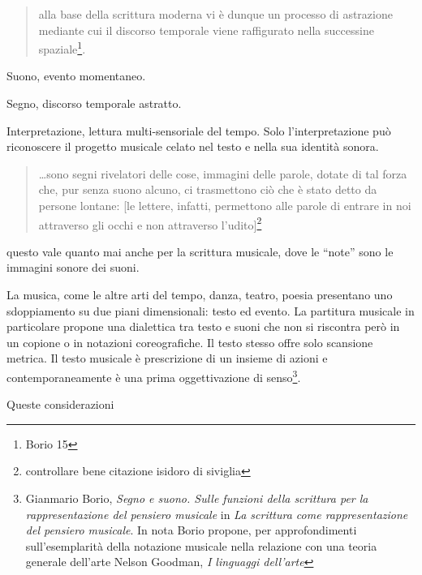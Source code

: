 \begin{multicols}{2}
\begin{quote}
	alla base della scrittura moderna vi è dunque un processo di astrazione mediante cui il discorso temporale viene raffigurato nella successine spaziale\footnote{Borio 15}.
\end{quote}

Suono, evento momentaneo.

Segno, discorso temporale astratto.

Interpretazione, lettura multi-sensoriale del tempo. Solo l'interpretazione può riconoscere il progetto musicale celato nel testo e nella sua identità sonora.

\begin{center}
\end{center}

\begin{quote}
	\ldots sono segni rivelatori delle cose, immagini delle parole, dotate di tal
	forza che, pur senza suono alcuno, ci trasmettono ciò che è stato detto da
	persone lontane: [le lettere, infatti, permettono alle parole di entrare in noi
	attraverso gli occhi e non attraverso l'udito]\footnote{controllare bene citazione isidoro di siviglia}
\end{quote}

questo vale quanto mai anche per la scrittura musicale, dove le “note” sono le immagini sonore dei suoni.


La musica, come le altre arti del tempo, danza, teatro, poesia presentano uno sdoppiamento su due piani dimensionali: testo ed evento.
La partitura musicale in particolare propone una dialettica tra testo e suoni che non si riscontra però in un copione o in notazioni coreografiche. Il testo stesso offre solo scansione metrica. Il testo musicale è prescrizione di un insieme di azioni e contemporaneamente è una prima oggettivazione di senso\footnote{Gianmario Borio, \emph{Segno e suono. Sulle funzioni della scrittura per la rappresentazione del pensiero musicale} in \emph{La scrittura come rappresentazione del pensiero musicale}. In nota Borio propone, per approfondimenti sull'esemplarità della notazione musicale nella relazione con una teoria generale dell'arte Nelson Goodman, \emph{I linguaggi dell'arte}}.

Queste considerazioni

\end{multicols}

%
